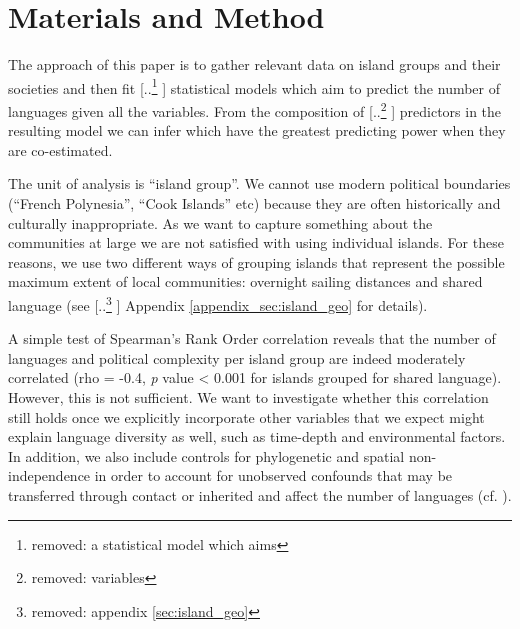 \documentclass[unnumsec,webpdf,modern,medium]{oup-authoring-template}
\providecommand{\DIFaddtex}[1]{{\protect\color{blue} \sf #1}} %
\providecommand{\DIFdeltex}[1]{{\protect\color{red} [..\footnote{removed: #1} ]}} %
\providecommand{\DIFaddbegin}{} %
\providecommand{\DIFaddend}{} %
\providecommand{\DIFdelbegin}{} %
\providecommand{\DIFdelend}{} %
\providecommand{\DIFadd}[1]{\texorpdfstring{\DIFaddtex{#1}}{#1}} %
\providecommand{\DIFdel}[1]{\texorpdfstring{\DIFdeltex{#1}}{}} %
\newcommand{\DIFscaledelfig}{0.5}
\newlength{\DIFdelgraphicswidth} %
\newlength{\DIFdelgraphicsheight} %
\newcommand{\DIFaddincludegraphics}[2][]{{\color{blue}\fbox{\DIFOincludegraphics[#1]{#2}}}} %
\newcommand{\DIFdelincludegraphics}[2][]{%
\sbox{\DIFdelgraphicsbox}{\DIFOincludegraphics[#1]{#2}}%
\settoboxwidth{\DIFdelgraphicswidth}{\DIFdelgraphicsbox} %
\settoboxtotalheight{\DIFdelgraphicsheight}{\DIFdelgraphicsbox} %
\scalebox{\DIFscaledelfig}{%
\parbox[b]{\DIFdelgraphicswidth}{\usebox{\DIFdelgraphicsbox}\\[-\baselineskip] \rule{\DIFdelgraphicswidth}{0em}}\llap{\resizebox{\DIFdelgraphicswidth}{\DIFdelgraphicsheight}{%
\setlength{\unitlength}{\DIFdelgraphicswidth}%
\begin{picture}(1,1)%
\thicklines\linethickness{2pt} %
{\color[rgb]{1,0,0}\put(0,0){\framebox(1,1){}}}%
{\color[rgb]{1,0,0}\put(0,0){\line( 1,1){1}}}%
{\color[rgb]{1,0,0}\put(0,1){\line(1,-1){1}}}%
\end{picture}%
}\hspace*{3pt}}} %
} %
\DeclareRobustCommand{\DIFaddbegin}{\DIFOaddbegin \let\includegraphics\DIFaddincludegraphics} %
\DeclareRobustCommand{\DIFaddend}{\DIFOaddend \let\includegraphics\DIFOincludegraphics} %
\DeclareRobustCommand{\DIFdelbegin}{\DIFOdelbegin \let\includegraphics\DIFdelincludegraphics} %
\DeclareRobustCommand{\DIFdelend}{\DIFOaddend \let\includegraphics\DIFOincludegraphics} %
\begin{document}
\FloatBarrier
\DIFaddend \section{Materials and Method}
\label{pol_complex_method}
The approach of this paper is to gather relevant data on island groups and their societies and then fit \DIFdelbegin \DIFdel{a statistical model which aims }\DIFdelend \DIFaddbegin \DIFadd{statistical models which aim }\DIFaddend to predict the number of languages given all the variables. From the composition of \DIFdelbegin \DIFdel{variables }\DIFdelend \DIFaddbegin \DIFadd{predictors }\DIFaddend in the resulting model we can infer which have the greatest predicting power when they are co-estimated.

The unit of analysis is ``island group''. We cannot use modern political boundaries (``French Polynesia'', ``Cook Islands'' etc) because they are often historically and culturally inappropriate. As we want to capture something about the communities at large we are not satisfied with using individual islands. For these reasons, we use two different ways of grouping islands \DIFaddbegin \DIFadd{that represent the possible maximum extent of local communities}\DIFaddend : overnight sailing distances and shared language (see \DIFdelbegin \DIFdel{appendix \ref{sec:island_geo} }\DIFdelend \DIFaddbegin \DIFadd{Appendix \ref{appendix_sec:island_geo} }\DIFaddend for details).

\DIFdelbegin %

\DIFdelend A simple test of Spearman's Rank Order correlation reveals that the number of languages and political complexity per island group are indeed moderately correlated (rho  = -0.4, \emph{p} value < 0.001 for islands grouped for shared language). However, this is not sufficient. We want to investigate whether this correlation still holds once we explicitly incorporate other variables that we expect might explain language diversity as well, such as time-depth and environmental factors. \DIFaddbegin \DIFadd{In addition, we also include controls for phylogenetic and spatial non-independence in order to account for unobserved confounds that may be transferred through contact or inherited and affect the number of languages (cf. \citet{gavin2013toward}).
}\DIFaddend 
\end{document}
